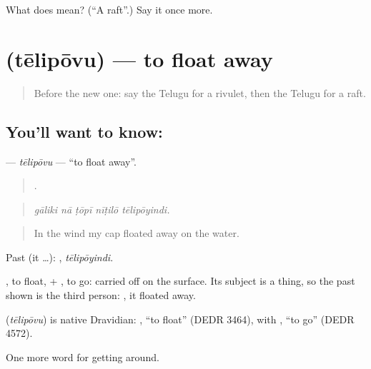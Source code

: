 \begin{tcolorbox}[breakable,colback=teal!4,colframe=teal!35!black,title={Before you move on}]
What does  mean? (\textquotedblleft{}A raft\textquotedblright{}.) Say it once more.
\end{tcolorbox}
\section[\texorpdfstring{\te{తేలిపోవు} (tēlipōvu)}{తేలిపోవు (tēlipōvu)}]{ (tēlipōvu) — to float away}

\label{lesson:TE-C453-telipovu}



\begin{quote}
Before the new one: say the Telugu for a rivulet, then the Telugu for a raft.
\end{quote}

\subsection*{You'll want to know: }
\textbf{} — \emph{tēlipōvu} — \textquotedblleft{}to float away\textquotedblright{}.

\begin{quote}
    .
\end{quote}

\begin{quote}
\emph{gāliki nā ṭōpī nīṭilō tēlipōyindi.}
\end{quote}

\begin{quote}
In the wind my cap floated away on the water.
\end{quote}

Past (it …): , \emph{tēlipōyindi}.

, to float, + , to go: carried off on the surface. Its subject is a thing, so the past shown is the third person: , it floated away.

\begin{cousinweb}
\textbf{} (\emph{tēlipōvu}) is native Dravidian: , \textquotedblleft{}to float\textquotedblright{} (DEDR 3464), with , \textquotedblleft{}to go\textquotedblright{} (DEDR 4572).
\end{cousinweb}

\begin{grammarlens}[title={What you've built}]
One more word for getting around.
\end{grammarlens}

